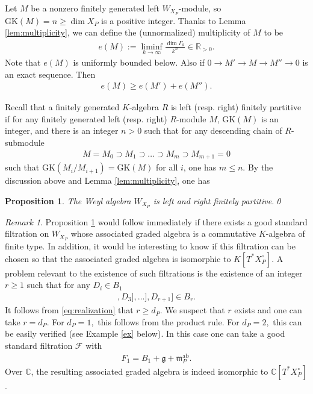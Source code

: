 \documentclass[11pt,a4paper,usenames,dvipsnames,reqno]{amsart}
\numberwithin{equation}{section}
\newcommand{\cc}{\mathbb C}
\newcommand{\rr}{\mathbb R}
\newtheorem{Prop}[Thm]{Proposition}
\theoremstyle{definition}
\theoremstyle{remark}
\newtheorem{Rem}[Thm]{Remark}
\begin{document}
Let $M$ be a nonzero finitely generated left $W_{X_P}$-module, so $\mathrm{GK}(M)=n\ge \dim X_P$ is a positive integer. Thanks to Lemma \ref{lem:multiplicity}, we can define the (unnormalized) multiplicity of $M$ to be
\begin{align*}
    e(M):=\liminf_{k\to \infty} \frac{\dim \Gamma_k }{k^n}\in \rr_{>0}.
\end{align*}
Note that $e(M)$ is uniformly bounded below. Also if $0\to M'\to M\to M''\to 0$ is an exact sequence. Then
\begin{align*}
    e(M)\ge e(M')+e(M'').
\end{align*}

Recall that a finitely generated $K$-algebra $R$ is left (resp. right) finitely partitive if for any finitely generated left (resp. right) $R$-module $M$, $\mathrm{GK}(M)$ is an integer, and there is an integer $n>0$ such that for any descending chain of $R$-submodule
\begin{align*}
    M=M_0\supset M_1\supset \ldots \supset M_m\supset M_{m+1}=0
\end{align*}
such that $\mathrm{GK}(M_i/M_{i+1})=\mathrm{GK}(M)$ for all $i$, one has $m\le n$. By the discussion above and Lemma \ref{lem:multiplicity}, one has

\begin{Prop}\label{prop:partitive}
    The Weyl algebra $W_{X_P}$ is left and right finitely partitive.\qed
\end{Prop}

\begin{Rem}
    Proposition \ref{prop:partitive} would follow immediately if there exists a good standard filtration on $W_{X_P}$ whose associated graded algebra is a commutative $K$-algebra of finite type. In addition, it would be interesting to know if this  filtration can be chosen so that the associated graded algebra is isomorphic to $K[T^\ast X_P^\circ].$  A problem relevant to the existence of such filtrations is the existence of an integer $r\ge 1$ such that for any $D_i\in B_1$
    \begin{align*}
            [[\ldots[[D_1,D_2],D_3],\ldots], D_{r+1}]\in B_r.
    \end{align*}
    It follows from \eqref{eq:realization} that $r\ge d_P$. We suspect that $r$ exists and one can take $r=d_P$. For $d_P=1,$ this follows from the product rule. For $d_P= 2,$ this can be easily verified (see Example \ref{ex} below). In this case one can take a good standard filtration $\mathcal{F}$ with
    \begin{align*}
        F_1=B_1+\mathfrak{g}+\mathfrak{m}_P^{\mathrm{ab}}.
    \end{align*}
    Over $\cc$, the resulting associated graded algebra is indeed isomorphic to $\cc[T^\ast X_P^\circ]$. 
\end{Rem}
\end{document}
